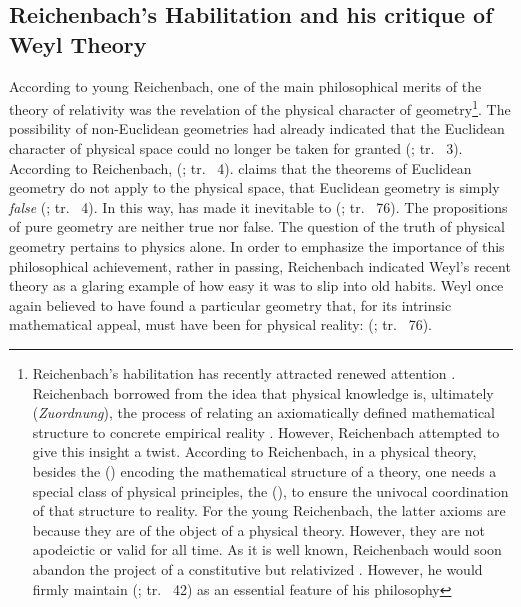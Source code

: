 \documentclass[draft]{article}
\newcommand{\rhp}[2]{(\cite[#1]{Reichenbach1920a}; tr.\ \citeyear{Reichenbach1969} #2)\xspace}
\begin{document}
\subsection{Reichenbach's Habilitation and his critique of Weyl Theory}

According to young Reichenbach, one of the main philosophical merits of the theory of relativity was the revelation of the physical character of geometry\footnote{Reichenbach's habilitation has recently attracted renewed attention \citep{Friedman2001}. Reichenbach borrowed from \citet{Schlick1918} the idea that physical knowledge is, ultimately (\emph{Zuordnung}), the process of relating an axiomatically defined mathematical structure to concrete empirical reality \citep{Padovani2009}. However, Reichenbach attempted to give this insight a  twist. According to Reichenbach, in a physical theory, besides the  () encoding the mathematical structure of a theory, one needs a special class of physical principles, the  (), to ensure the univocal coordination of that structure to reality. For the young Reichenbach, the latter axioms are \apr because they are  of the object of a physical theory. However, they are not apodeictic or valid for all time. As it is well known, Reichenbach would soon abandon the project of a constitutive but relativized \apr. However, he would firmly maintain  \rhp{40}{42} as an essential feature of his philosophy}. The possibility of non-Euclidean geometries had already indicated that the Euclidean character of physical space could no longer be taken for granted \rhp{3}{3}. According to Reichenbach,  \rhp{3}{4}. \Rt claims that the theorems of Euclidean geometry do not apply to the physical space, that Euclidean geometry is simply \emph{false} \rhp{3}{4}. In this way, \rt has made it inevitable to  \rhp{73}{76}. The propositions of pure geometry are neither true nor false. The question of the truth of physical geometry pertains to physics alone. In order to emphasize the importance of this philosophical achievement, rather in passing, Reichenbach indicated Weyl's recent theory as a glaring example of how easy it was to slip into old habits. Weyl once again believed to have found a particular geometry that, for its intrinsic mathematical appeal, must have been  for physical reality:  \rhp{73}{76}.
\end{document}
